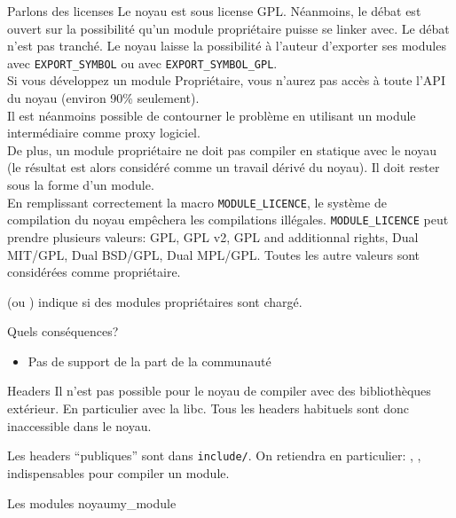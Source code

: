 \begin{frame}[fragile=singleslide]{Parlons des licenses}
  Le noyau est sous license GPL. Néanmoins, le débat est ouvert sur la
  possibilité  qu'un module  propriétaire puisse  se linker  avec.  Le
  débat n'est pas  tranché. Le noyau laisse la  possibilité à l'auteur
  d'exporter   ses   modules   avec   \verb+EXPORT_SYMBOL+   ou   avec
  \verb+EXPORT_SYMBOL_GPL+.
  \\[2ex]
  Si vous développez un module Propriétaire, vous n'aurez pas accès à
  toute l'API du noyau (environ 90\% seulement).
  \\[2ex]
  Il est néanmoins possible de contourner le problème en utilisant un
  module intermédiaire comme proxy logiciel.
  \\[2ex]
  De plus,  un module  propriétaire ne doit  pas compiler  en statique
  avec  le noyau  (le résultat  est alors  considéré comme  un travail
  dérivé du noyau). Il doit rester sous la forme d'un module.
  \\[2ex]
  En  remplissant  correctement  la  macro  \verb+MODULE_LICENCE+,  le
  système   de  compilation  du   noyau  empêchera   les  compilations
  illégales.   \verb+MODULE_LICENCE+ peut  prendre  plusieurs valeurs:
  GPL, GPL v2, GPL and additionnal rights, Dual MIT/GPL, Dual BSD/GPL,
  Dual  MPL/GPL.   Toutes les  autre  valeurs  sont considérées  comme
  propriétaire.

   (ou  ) indique  si des
  modules propriétaires sont chargé.
  
  Quels conséquences?
  \begin{itemize} 
  \item Pas de support de la part de la communauté
  \end{itemize} 
\end{frame}

\begin{frame}{Headers}
  Il  n'est  pas   possible  pour  le  noyau  de   compiler  avec  des
  bibliothèques  extérieur.  En  particulier  avec la  libc. Tous  les
  headers habituels sont donc inaccessible dans le noyau.

  Les headers ``publiques'' sont dans \verb+include/+. On retiendra en
  particulier:       ,       ,
   indispensables pour compiler un module.

\end{frame} 

\begin{frame}[fragile=singleslide]{Les modules noyau}{my\_module}
  
\end{frame}


